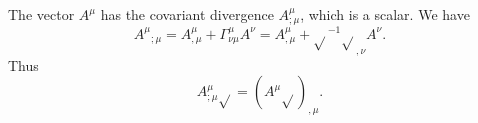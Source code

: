The vector $A^\mu$ has the covariant divergence $A^\mu_{;\mu}$, which is a scalar. We have
\[
    {A^\mu}_{;\mu} = A^\mu_{,\mu} + \Gamma^\mu_{\nu\mu} A^\nu = A^\mu_{,\mu}+\sqrt{}^{-1}\sqrt{}_{,\nu}A^\nu.
\]
Thus
\begin{equation}
 \label{ecuacion 21.1}
 A^\mu_{;\mu} \sqrt{} = \left( A^\mu \sqrt{} \right)_{,\mu}.
\end{equation}
